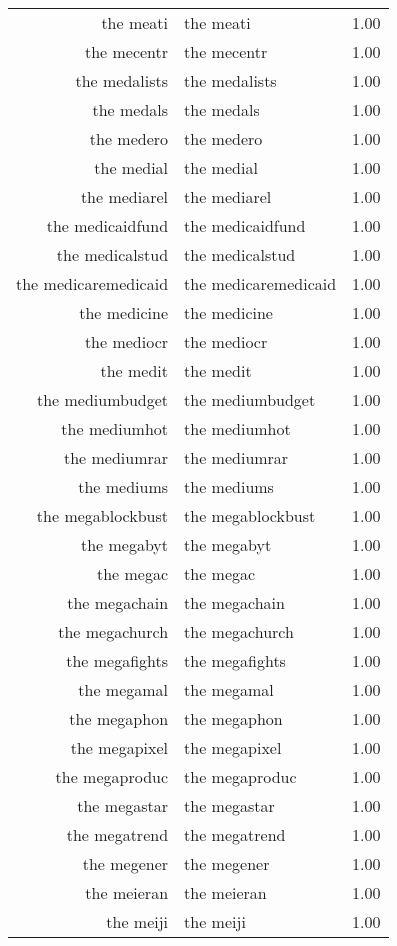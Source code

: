 \begin{table}[ht]
\begin{tabular}{rlr}
  the meati & the meati & 1.00 \\ 
  the mecentr & the mecentr & 1.00 \\ 
  the medalists & the medalists & 1.00 \\ 
  the medals & the medals & 1.00 \\ 
  the medero & the medero & 1.00 \\ 
  the medial & the medial & 1.00 \\ 
  the mediarel & the mediarel & 1.00 \\ 
  the medicaidfund & the medicaidfund & 1.00 \\ 
  the medicalstud & the medicalstud & 1.00 \\ 
  the medicaremedicaid & the medicaremedicaid & 1.00 \\ 
  the medicine & the medicine & 1.00 \\ 
  the mediocr & the mediocr & 1.00 \\ 
  the medit & the medit & 1.00 \\ 
  the mediumbudget & the mediumbudget & 1.00 \\ 
  the mediumhot & the mediumhot & 1.00 \\ 
  the mediumrar & the mediumrar & 1.00 \\ 
  the mediums & the mediums & 1.00 \\ 
  the megablockbust & the megablockbust & 1.00 \\ 
  the megabyt & the megabyt & 1.00 \\ 
  the megac & the megac & 1.00 \\ 
  the megachain & the megachain & 1.00 \\ 
  the megachurch & the megachurch & 1.00 \\ 
  the megafights & the megafights & 1.00 \\ 
  the megamal & the megamal & 1.00 \\ 
  the megaphon & the megaphon & 1.00 \\ 
  the megapixel & the megapixel & 1.00 \\ 
  the megaproduc & the megaproduc & 1.00 \\ 
  the megastar & the megastar & 1.00 \\ 
  the megatrend & the megatrend & 1.00 \\ 
  the megener & the megener & 1.00 \\ 
  the meieran & the meieran & 1.00 \\ 
  the meiji & the meiji & 1.00 \\ 

\end{tabular}
\end{table}
